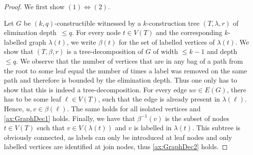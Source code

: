 \documentclass{lmcs}
\theoremstyle{plain}\newtheorem{claim}[thm]{Claim}   %
\newcommand{\elimOrd}[2]{$(#1,#2)$-constructible}
\newcommand{\elimDepth}{elimination depth}
\begin{document}
\begin{proof}
	We first show $(1)\Leftrightarrow (2)$.
	
	Let $G$ be \elimOrd{k}{q} witnessed by a $k$-construction tree $(T,\lambda,r)$ of \elimDepth\ $\leq q$.
	For every node $t\in V(T)$ and the corresponding $k$-labelled graph $\lambda(t)$, we write $\beta(t)$ for the set of labelled vertices of $\lambda(t)$.
	We show that $(T,\beta,r)$ is a tree-decomposition of $G$ of width $\leq k-1$ and depth $\leq q$.
	We observe that the number of vertices that are in any bag of a path from the root to some leaf equal the number of times a label was removed on the same path and therefore is bounded by the \elimDepth.
	Thus one only has to show that this is indeed a tree-decomposition.
	For every edge $uv\in E(G)$, there has to be some leaf $\ell\in V(T)$, such that the edge is already present in $\lambda(\ell)$. Hence, $u,v \in \beta(\ell)$.
	The same holds for all isolated vertices and \ref{ax:GraphDec1} holds.
	Finally, we have that $\beta^{-1}(v)$ is the subset of nodes $t\in V(T)$ such that $v\in V(\lambda(t))$ and $v$ is labelled in $\lambda(t)$.
	This subtree is obviously connected, as labels can only be introduced at leaf nodes and only labelled vertices are identified at join nodes, thus \ref{ax:GraphDec2} holds.
	

\end{proof}
\end{document}

